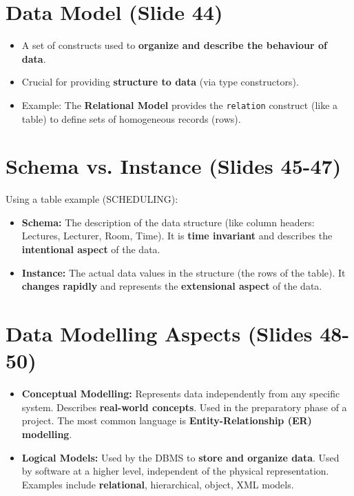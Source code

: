\documentclass{article}
\begin{document}
	\section{Data Model (Slide 44)}
	\begin{itemize}
		\item A set of constructs used to \textbf{organize and describe the behaviour of data}.
		\item Crucial for providing \textbf{structure to data} (via type constructors).
		\item Example: The \textbf{Relational Model} provides the \texttt{relation} construct (like a table) to define sets of homogeneous records (rows).
	\end{itemize}
	
	\section{Schema vs. Instance (Slides 45-47)}
	Using a table example (SCHEDULING):
	\begin{itemize}
		\item \textbf{Schema:} The description of the data structure (like column headers: Lectures, Lecturer, Room, Time). It is \textbf{time invariant} and describes the \textbf{intentional aspect} of the data.
		\item \textbf{Instance:} The actual data values in the structure (the rows of the table). It \textbf{changes rapidly} and represents the \textbf{extensional aspect} of the data.
	\end{itemize}
	
	\section{Data Modelling Aspects (Slides 48-50)}
	\begin{itemize}
		\item \textbf{Conceptual Modelling:} Represents data independently from any specific system. Describes \textbf{real-world concepts}. Used in the preparatory phase of a project. The most common language is \textbf{Entity-Relationship (ER) modelling}.
		\item \textbf{Logical Models:} Used by the DBMS to \textbf{store and organize data}. Used by software at a higher level, independent of the physical representation. Examples include \textbf{relational}, hierarchical, object, XML models.
	\end{itemize}
	
\end{document}
